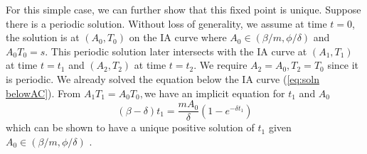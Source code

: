 \documentclass[review,authoryear]{elsarticle}
\begin{document}
For this simple case, we can further show that this fixed point is
unique. Suppose there is a periodic solution. Without loss of generality,
we assume at time $t=0$, the solution is at $(A_{0},T_{0})$ on the
IA curve where $A_{0}\in(\beta/m,\phi/\delta)$ and $A_{0}T_{0}=s$.
This periodic solution later intersects with the IA curve at $(A_{1},T_{1})$
at time $t=t_{1}$ and $(A_{2},T_{2})$ at time $t=t_{2}$. We require
$A_{2}=A_{0},T_{2}=T_{0}$ since it is periodic. We already solved
the equation below the IA curve (\ref{eq:soln belowAC}). From $A_{1}T_{1}=A_{0}T_{0},$we
have an implicit equation for $t_{1}$ and $A_{0}$
\begin{equation}
(\beta-\delta)t_{1}=\frac{mA_{0}}{\delta}(1-e^{-\delta t_{1}})\label{eq:A1T1=00003DA0T0}
\end{equation}
which can be shown to have a unique positive solution of $t_{1}$
given $A_{0}\in(\beta/m,\phi/\delta)$ . 
\end{document}
